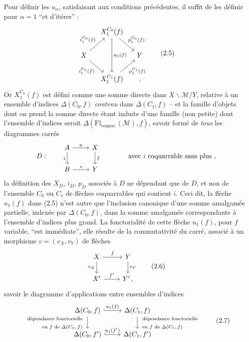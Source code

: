 \documentclass[11pt]{article}
\newcommand{\printedpage}[1]{\marginpar{\footnotesize p.~#1}}
\newcommand{\msp}[1]{\marginpar{\footnotesize [#1]}}
\newcommand{\Fl}{\mathrm{Fl}}
\newcommand{\cM}{\mathcal{M}}
\begin{document}
\msp{page 14}

Pour définir les $u_\alpha$, satisfaisant aux conditions précédentes, il suffit de les définir pour $\alpha=1$ ``et d'itérer'' :
\[
\begin{tikzcd}[column sep=small]
& X_1^{C_0}(f) \arrow[dd, "u_1(f)"] \arrow[dr, "p_1^{C_0}(f)"] & \\
X \arrow[ur, "i_1^{C_0}(f)"] \arrow[dr, "i_1^{C_1}(f)"'] & & Y \\
& X_1^{C_1}(f) \arrow[ur, "p_1^{C_1}(f)"'] & {}.
\end{tikzcd}
\tag*{(2.5)}
\]
Or $X_1^{C_0}(f)$ est défini comme une somme directe dans $X\backslash\cM/Y$, relative à un ensemble d'indices $\Delta(C_0,f)$ \textit{contenu} dans $\Delta(C_1,f)$ -- et la famille d'objets dont on prend la somme directe étant induite d'une famille (non petite) dont l'ensemble d'indices serait $\Delta(\Fl_{\text{coquar.}}(\cM),f)$, savoir formé de \textit{tous} les diagrammes carrés
\printedpage{11}
\[
D : \qquad
\begin{tikzcd}
A \arrow[r, "u"] \arrow[d, "i"'] & X \arrow[d, "f"] \\
B \arrow[r, "v"] & Y
\end{tikzcd}
\qquad\qquad \text{avec $i$ coquarrable sans plus ,}
\]
la définition des $X_D$, $i_D$, $p_D$ associés à $D$ ne dépendant que de $D$, et non de l'ensemble $C_0$ ou $C_1$ de flèches coquarrables qui contient $i$. Ceci dit, la flèche $u_1(f)$
\msp{page 15}
dans (2.5) n'est autre que l'inclusion canonique d'une somme amalgamée partielle, indexée par $\Delta(C_0,f)$, dans la somme amalgamée correspondante à l'ensemble d'indices plus grand. La fonctorialité de cette flèche $u_1(f)$, pour $f$ variable, ``est immédiate'', elle résulte de la commutativité du carré, associé à un morphisme $v=(v_X,v_Y)$ de flèches
\[
\begin{tikzcd}
X \arrow[r, "f"] \arrow[d, "v_X"'] & Y \arrow[d, "v_Y"] \\
X' \arrow[r, "f'"] & Y'\,,
\end{tikzcd}
\tag*{(2.6)}
\]
savoir le diagramme d'applications entre ensembles d'indices
\[
\begin{tikzcd}
\Delta(C_0,f) \arrow[r, hook, "u_1(f)"] \arrow[d, "{\begin{array}{r}\text{dépendance fonctorielle}\\ \text{en $f$ de $\Delta(C_0,f)$}\end{array}}"'] & \Delta(C_1,f) \arrow[d, "{\begin{array}{l}\text{dépendance fonctorielle}\\ \text{en $f$ de $\Delta(C_1,f)$}\end{array}}"] \\
\Delta(C_0,f') \arrow[r, hook, "u_1(f')"] & \Delta(C_1,f')
\end{tikzcd}
\tag*{(2.7)}
\]
\end{document}
